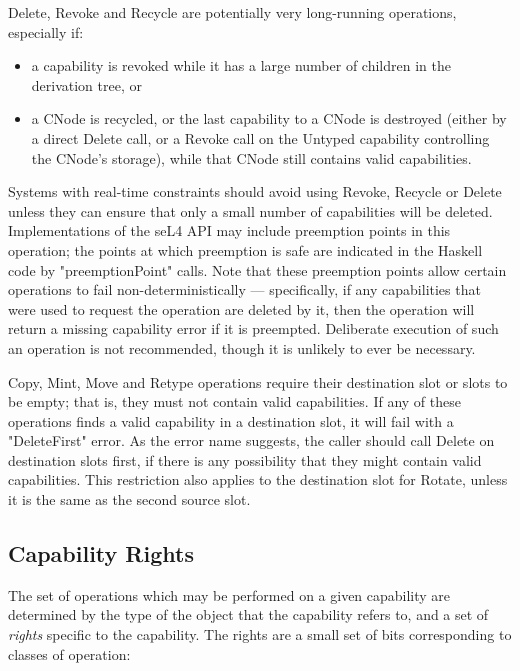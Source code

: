 Delete, Revoke and Recycle are potentially very long-running operations, especially if:
\begin{itemize}
\item a capability is revoked while it has a large number of children in the
derivation tree, or
\item a CNode is recycled, or the last capability to a CNode is destroyed (either by a direct Delete call, or a Revoke call on the Untyped capability controlling the CNode's storage), while that CNode still contains valid capabilities.
\end{itemize}

Systems with real-time constraints should avoid using Revoke, Recycle or Delete unless
they can ensure that only a small number of capabilities will be deleted.
Implementations of the seL4 API may include preemption points in this operation; the points at which preemption is safe are indicated in the Haskell code by "preemptionPoint" calls. Note that these preemption points allow certain operations to fail non-deterministically --- specifically, if any capabilities that were used to request the operation are deleted by it, then the operation will return a missing capability error if it is preempted. Deliberate execution of such an operation is not recommended, though it is unlikely to ever be necessary.

Copy, Mint, Move and Retype operations require their destination slot
or slots to be empty; that is, they must not contain valid capabilities. If any
of these operations finds a valid capability in a destination slot, it will
fail with a "DeleteFirst" error. As the error name suggests, the caller should
call Delete on destination slots first, if there is any possibility that they
might contain valid capabilities. This restriction also applies to the destination slot for Rotate, unless it is the same as the second source slot.

\subsection{Capability Rights}\label{sec:overview.cspace.rights}

The set of operations which may be performed on a given capability are
determined by the type of the object that the capability refers to, and a set
of \emph{rights} specific to the capability. The rights are a small set of bits corresponding to classes of operation:

